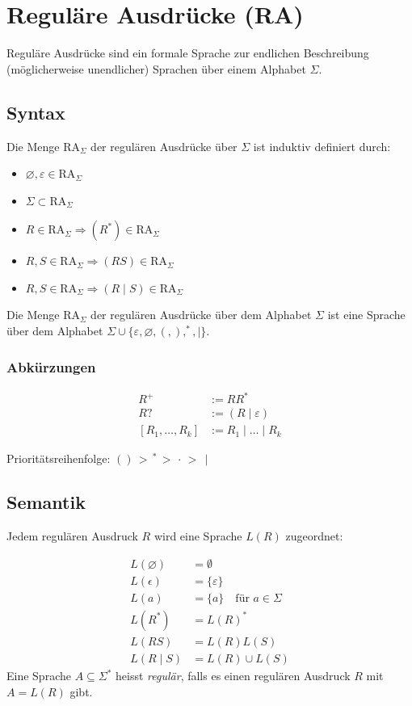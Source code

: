 \section{Reguläre Ausdrücke (RA)}
Reguläre Ausdrücke sind ein formale Sprache zur endlichen Beschreibung
(möglicherweise unendlicher) Sprachen über einem Alphabet $\Sigma$.

\subsection{Syntax}
Die Menge $\text{RA}_\Sigma$ der regulären Ausdrücke über $\Sigma$ ist
induktiv definiert durch:
\begin{itemize}
    \item $\varnothing, \varepsilon \in \text{RA}_\Sigma$
    \item \(\Sigma \subset \text{RA}_\Sigma\)
    \item \(R \in \text{RA}_\Sigma \Rightarrow (R^*) \in \text{RA}_\Sigma\)
    \item \(R,S \in \text{RA}_\Sigma \Rightarrow (RS) \in \text{RA}_\Sigma\)
    \item \(R,S \in \text{RA}_\Sigma \Rightarrow (R \mid S) \in \text{RA}_\Sigma\)
\end{itemize}

Die Menge \(\text{RA}_\Sigma\) der regulären Ausdrücke über dem Alphabet \(\Sigma\) ist eine Sprache über dem Alphabet \(\Sigma \cup \{\varepsilon, \varnothing, (, ), ^*, \mid\}\).

\subsubsection{Abkürzungen}
\begin{align*}
    R^+             & := RR^*                    \\
    R?              & := (R \mid \varepsilon)    \\
    [R_1,\dots,R_k] & := R_1 \mid \dots \mid R_k
\end{align*}

Prioritätsreihenfolge: \(() \, > \, ^* \, > \, \cdot \, > \, \mid\)


\subsection{Semantik}
Jedem regulären Ausdruck $R$ wird eine Sprache $L(R)$ zugeordnet:

\begin{align*}
    L(\varnothing) & = \emptyset                            \\
    L(\epsilon)    & = \{\varepsilon\}                      \\
    L(a)           & = \{a\} \quad \text{für } a \in \Sigma \\
    L(R^*)         & = L(R)^*                               \\
    L(RS)          & = L(R)L(S)                             \\
    L(R \mid S)    & = L(R) \cup L(S)
\end{align*}
Eine Sprache $A \subseteq \Sigma^*$ heisst \emph{regulär}, falls es einen
regulären Ausdruck $R$ mit $A = L(R)$ gibt.

